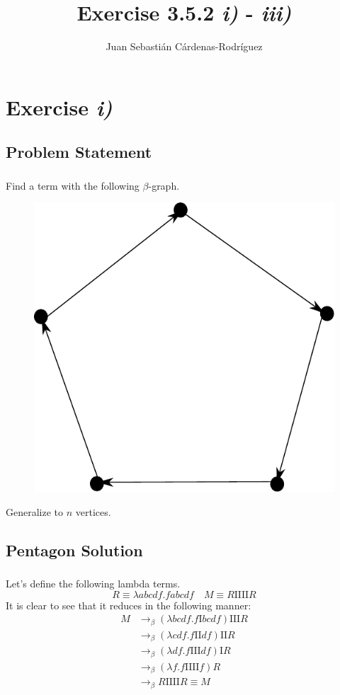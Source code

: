 \documentclass{beamer}
\title{Exercise 3.5.2 \textit{i)} - \textit{iii)}}
\author{Juan Sebasti\'an C\'ardenas-Rodríguez \\
  \scalebox{0.7}{Mathematical Engineering, Universidad EAFIT}}
\theoremstyle{definition}
\theoremstyle{remark}
\theoremstyle{example}
\newif\ifinsection
\newif\ifinsubsection
\let\oldsection\section
\renewcommand{\section}{
  \global\insectiontrue
  \global\insubsectionfalse
  \oldsection}
\let\oldsubsection\subsection
\renewcommand{\subsection}{
  \global\insubsectiontrue
  \oldsubsection}
\newcommand {\aframe}[1] {
  \begin{frame}
    \ifinsection\frametitle{\secname}\fi
    \ifinsubsection\framesubtitle{\subsecname}\fi
  #1
  \end{frame}
}
\newcommand{\I}{\pmb{\mathrm{I}}}
\begin{document}
\begin{frame}[plain]
  \titlepage
\end{frame}

\section{Exercise \textit{i)}}
\subsection{Problem Statement}
\aframe{Find a term with the following $\beta$-graph.
  \begin{figure}[H]
    \centering \includegraphics[scale=0.6]{../../graphs/exercise-3-5-2-i.pdf}
  \end{figure}
  Generalize to $n$ vertices. }

\subsection{Pentagon Solution}
\aframe{ Let's define the following lambda terms.
  \begin{equation*}
    R \equiv \lambda abcdf. fabcdf  \quad M \equiv R\I\I\I\I R
  \end{equation*} \pause
  It is clear to see that it reduces in the following manner:
  \begin{align*}
    M &\rightarrow_\beta (\lambda bcdf. f\I bcdf)\I\I\I R \\
      &\rightarrow_\beta (\lambda cdf. f\I\I df)\I\I R \\
      &\rightarrow_\beta (\lambda df. f\I\I\I df)\I R \\
      &\rightarrow_\beta (\lambda f. f\I\I\I\I f) R \\
      &\rightarrow_\beta R\I\I\I\I R \equiv M
  \end{align*}
}
\end{document}
